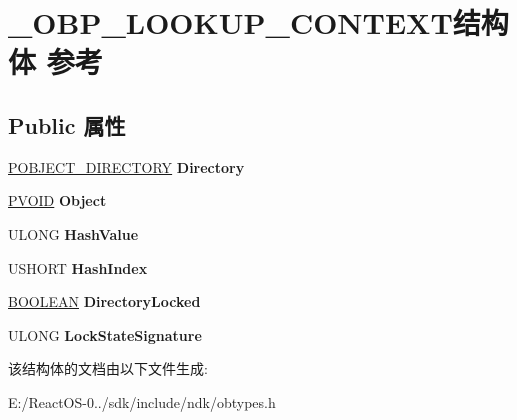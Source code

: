 \hypertarget{struct___o_b_p___l_o_o_k_u_p___c_o_n_t_e_x_t}{}\section{\+\_\+\+O\+B\+P\+\_\+\+L\+O\+O\+K\+U\+P\+\_\+\+C\+O\+N\+T\+E\+X\+T结构体 参考}
\label{struct___o_b_p___l_o_o_k_u_p___c_o_n_t_e_x_t}
\subsection*{Public 属性}
\begin{DoxyCompactItemize}
\item 
\mbox{\label{struct___o_b_p___l_o_o_k_u_p___c_o_n_t_e_x_t_a43765ff7e4e42c4b6fbe070925ddaae7}} 
\hyperlink{struct___o_b_j_e_c_t___d_i_r_e_c_t_o_r_y}{P\+O\+B\+J\+E\+C\+T\+\_\+\+D\+I\+R\+E\+C\+T\+O\+RY} {\bfseries Directory}
\item 
\mbox{\label{struct___o_b_p___l_o_o_k_u_p___c_o_n_t_e_x_t_aec3ff70faa338eb660dd27aff6366109}} 
\hyperlink{interfacevoid}{P\+V\+O\+ID} {\bfseries Object}
\item 
\mbox{\label{struct___o_b_p___l_o_o_k_u_p___c_o_n_t_e_x_t_ae1ecb6ad1748f7112a8e6d17a72c0137}} 
U\+L\+O\+NG {\bfseries Hash\+Value}
\item 
\mbox{\label{struct___o_b_p___l_o_o_k_u_p___c_o_n_t_e_x_t_acf59141c7bc0462c3027c631b1bafae2}} 
U\+S\+H\+O\+RT {\bfseries Hash\+Index}
\item 
\mbox{\label{struct___o_b_p___l_o_o_k_u_p___c_o_n_t_e_x_t_a2db1794eadb9be6060f7370598e0fe6e}} 
\hyperlink{_processor_bind_8h_a112e3146cb38b6ee95e64d85842e380a}{B\+O\+O\+L\+E\+AN} {\bfseries Directory\+Locked}
\item 
\mbox{\label{struct___o_b_p___l_o_o_k_u_p___c_o_n_t_e_x_t_a79141a5a6cea1370bd3b7486fd972e1f}} 
U\+L\+O\+NG {\bfseries Lock\+State\+Signature}
\end{DoxyCompactItemize}


该结构体的文档由以下文件生成\+:\begin{DoxyCompactItemize}
\item 
E\+:/\+React\+O\+S-\/0../sdk/include/ndk/obtypes.\+h\end{DoxyCompactItemize}

